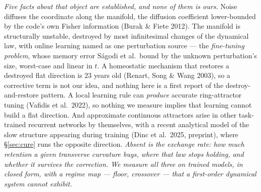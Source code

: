 \documentclass{article}
\begin{document}
\emph{Five facts about that object are established, and none of them is ours.} Noise diffuses the coordinate along the manifold, the diffusion coefficient lower-bounded by the code's own Fisher information (Burak \& Fiete 2012). The manifold is structurally unstable, destroyed by most infinitesimal changes of the dynamical law, with online learning named as one perturbation source --- the \emph{fine-tuning problem}, whose memory error S\'agodi et al.\ bound by the unknown perturbation's size, worst-case and linear in $t$. A homeostatic mechanism that restores a destroyed flat direction is $23$ years old (Renart, Song \& Wang 2003), so a corrective term is not our idea, and nothing here is a first report of the destroy-and-restore pattern. A local learning rule can \emph{produce} accurate ring-attractor tuning (Vafidis et al.\ 2022), so nothing we measure implies that learning cannot build a flat direction. And approximate continuous attractors arise in other task-trained recurrent networks by themselves, with a recent analytical model of the slow structure appearing during training (Dinc et al.\ 2025, preprint), where \S\ref{sec:cure} runs the opposite direction. \emph{Absent is the exchange rate: how much retention a given transverse curvature buys, where that law stops holding, and whether it survives the correction. We measure all three on trained models, in closed form, with a regime map --- floor, crossover --- that a first-order dynamical system cannot exhibit.}
\end{document}
